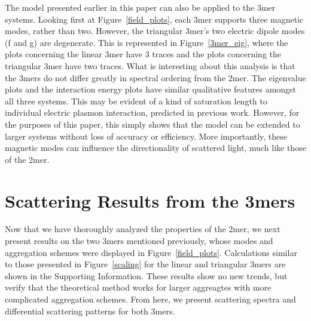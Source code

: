 \documentclass[journal=apchd5,manuscript=article]{achemso}
\begin{document}
The model presented earlier in this paper can also be applied to the 3mer systems. Looking first at Figure~\ref{field_plots}, each 3mer supports three magnetic modes, rather than two. However, the triangular 3mer's two electric dipole modes (f and g) are degenerate. This is represented in Figure~\ref{3mer_eig}, where the plots concerning the linear 3mer have 3 traces and the plots concerning the triangular 3mer have two traces. What is interesting about this analysis is that the 3mers do not differ greatly in spectral ordering from the 2mer. The eigenvalue plots and the interaction energy plots have similar qualitative features amongst all three systems. This may be evident of a kind of saturation length to individual electric plasmon interaction, predicted in previous work.\cite{Pinchuk2016} However, for the purposes of this paper, this simply shows that the model can be extended to larger systems without loss of accuracy or efficiency. More importantly, these magnetic modes can influence the directionality of scattered light, much like those of the 2mer.

\section{Scattering Results from the 3mers}
Now that we have thoroughly analyzed the properties of the 2mer, we next present results on the two 3mers mentioned previously, whose modes and aggregation schemes were displayed in Figure~\ref{field_plots}. Calculations similar to those presented in Figure~\ref{scaling} for the linear and triangular 3mers are shown in the Supporting Information. These results show no new trends, but verify that the theoretical method works for larger aggreagtes with more complicated aggregation schemes. From here, we present scattering spectra and differential scattering patterns for both 3mers.
\end{document}
